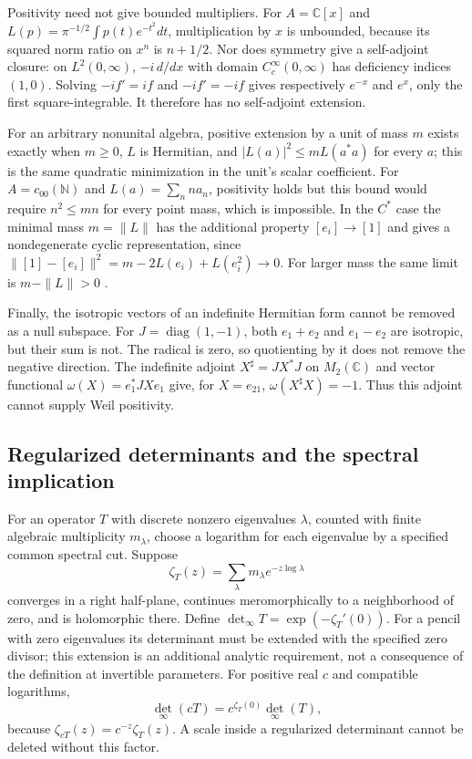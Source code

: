 Positivity need not give bounded multipliers.  For $A=\mathbb C[x]$ and
$L(p)=\pi^{-1/2}\int p(t)e^{-t^2}dt$, multiplication by $x$ is unbounded,
because its squared norm ratio on $x^n$ is $n+1/2$.
Nor does symmetry give a self-adjoint closure: on $L^2(0,\infty)$,
$-i\,d/dx$ with domain $C_c^\infty(0,\infty)$ has deficiency indices
$(1,0)$.  Solving $-if'=if$ and $-if'=-if$ gives respectively $e^{-x}$
and $e^x$, only the first square-integrable.
It therefore has no self-adjoint extension.

For an arbitrary nonunital algebra, positive extension by a unit of mass
$m$ exists exactly when $m\geq0$, $L$ is Hermitian, and
$|L(a)|^2\leq mL(a^*a)$ for every $a$; this is the same quadratic
minimization in the unit's scalar coefficient.
For $A=c_{00}(\mathbb N)$ and $L(a)=\sum_nna_n$, positivity holds but this
bound would require $n^2\leq mn$ for every point mass, which is impossible.
In the $C^*$ case the minimal mass $m=\|L\|$ has the additional property
$[e_i]\to[1]$ and gives a nondegenerate cyclic representation, since
$\|[1]-[e_i]\|^2=m-2L(e_i)+L(e_i^2)\to0$.
For larger mass the same limit is $m-\|L\|>0$
\cite[pp.~75--79]{syn-arith:Segal}.

Finally, the isotropic vectors of an indefinite Hermitian form cannot be
removed as a null subspace.  For $J=\operatorname{diag}(1,-1)$, both
$e_1+e_2$ and $e_1-e_2$ are isotropic, but their sum is not.
The radical is zero, so quotienting by it does not remove the negative
direction.  The indefinite adjoint $X^\sharp=JX^*J$ on $M_2(\mathbb C)$
and vector functional $\omega(X)=e_1^*JXe_1$ give, for $X=e_{21}$,
$\omega(X^\sharp X)=-1$.  Thus this adjoint cannot supply Weil positivity.

\subsection{Regularized determinants and the spectral implication}
\label{syn-arith:deninger}
For an operator $T$ with discrete nonzero eigenvalues $\lambda$, counted
with finite algebraic multiplicity $m_\lambda$, choose a logarithm for each
eigenvalue by a specified common spectral cut.  Suppose
\[
 \zeta_T(z)=\sum_\lambda m_\lambda e^{-z\log\lambda}
\]
converges in a right half-plane, continues meromorphically to a neighborhood
of zero, and is holomorphic there.  Define
$\det_\infty T=\exp(-\zeta_T'(0))$.
For a pencil with zero eigenvalues its determinant must be extended with
the specified zero divisor; this extension is an additional analytic
requirement, not a consequence of the definition at invertible parameters.
For positive real $c$ and compatible logarithms,
\[
 \det_\infty(cT)=c^{\zeta_T(0)}\det_\infty(T),
\]
because $\zeta_{cT}(z)=c^{-z}\zeta_T(z)$.
A scale inside a regularized determinant cannot be deleted without this
factor.

